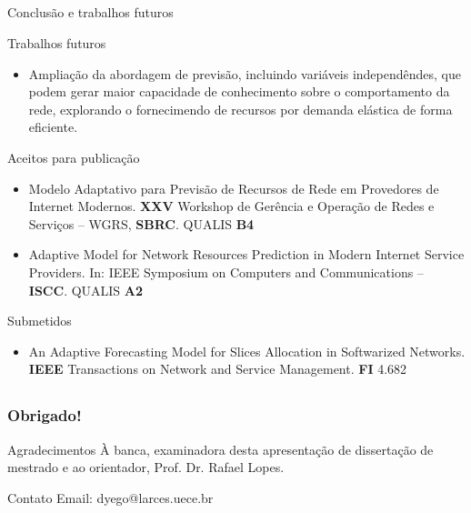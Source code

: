 \documentclass[aspectratio=169]{beamer}
\begin{document}
\subsection{}
\begin{frame}{Conclusão e trabalhos futuros}\vspace{-0.2cm}
    \begin{block}{Trabalhos futuros}
    \begin{itemize}[]
        \item   Ampliação da abordagem de previsão, incluindo variáveis independêndes, que podem gerar maior capacidade de conhecimento sobre o comportamento da rede, explorando o fornecimendo de recursos por demanda elástica de forma eficiente.
    \end{itemize}
 \end{block}
 \begin{block}{Aceitos para publicação}
\begin{itemize}[triangle]\footnotesize
    \item Modelo Adaptativo para Previsão de Recursos de Rede em Provedores de Internet Modernos. \textbf{XXV} Workshop de Gerência e Operação de Redes e Serviços -- WGRS, \textbf{SBRC}. QUALIS \textbf{B4}
    \item Adaptive Model for Network Resources Prediction in Modern Internet Service Providers. In: IEEE Symposium on Computers and Communications -- \textbf{ISCC}. QUALIS \textbf{A2}
\end{itemize}
\end{block}
\begin{block}{Submetidos}\footnotesize
\begin{itemize}[square]
    \item An Adaptive Forecasting Model for Slices Allocation in Softwarized Networks. \textbf{IEEE} Transactions on Network and Service Management. \textbf{FI} 4.682
\end{itemize}
\end{block}
\end{frame}


\subsection{}
\begin{frame}
\frametitle{Obrigado!}

\begin{block}{Agradecimentos}\small
À banca, examinadora desta apresentação de dissertação de mestrado e ao orientador, Prof. Dr. Rafael Lopes.


\end{block}

\begin{block}{Contato}\small
Email: dyego@larces.uece.br
\end{block}

\end{frame}
\end{document}
